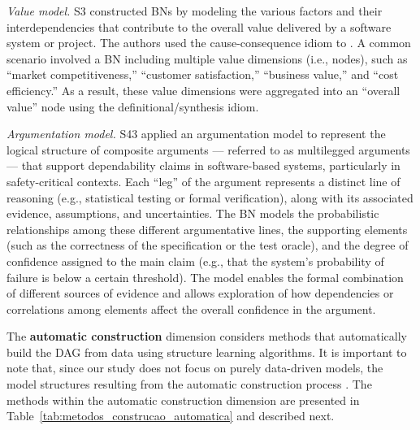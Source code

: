 \textit{Value model.} S3 constructed BNs by modeling the various factors and their interdependencies that contribute to the overall value delivered by a software system or project. The authors used the cause-consequence idiom to . A common scenario involved a BN including multiple value dimensions (i.e., nodes), such as ``market competitiveness,'' ``customer satisfaction,'' ``business value,'' and ``cost efficiency.'' As a result, these value dimensions were aggregated into an ``overall value'' node using the definitional/synthesis idiom.

\textit{Argumentation model.} S43 applied an argumentation model to represent the logical structure of composite arguments --- referred to as multilegged arguments --- that support dependability claims in software-based systems, particularly in safety-critical contexts. Each ``leg'' of the argument represents a distinct line of reasoning (e.g., statistical testing or formal verification), along with its associated evidence, assumptions, and uncertainties. The BN models the probabilistic relationships among these different argumentative lines, the supporting elements (such as the correctness of the specification or the test oracle), and the degree of confidence assigned to the main claim (e.g., that the system's probability of failure is below a certain threshold). The model enables the formal combination of different sources of evidence and allows exploration of how dependencies or correlations among elements affect the overall confidence in the argument.

The \textbf{automatic construction} dimension considers methods that automatically build the DAG from data using structure learning algorithms. It is important to note that, since our study does not focus on purely data-driven models, the model structures resulting from the automatic construction process .  The methods within the automatic construction dimension are presented in Table~\ref{tab:metodos_construcao_automatica} and described next.

